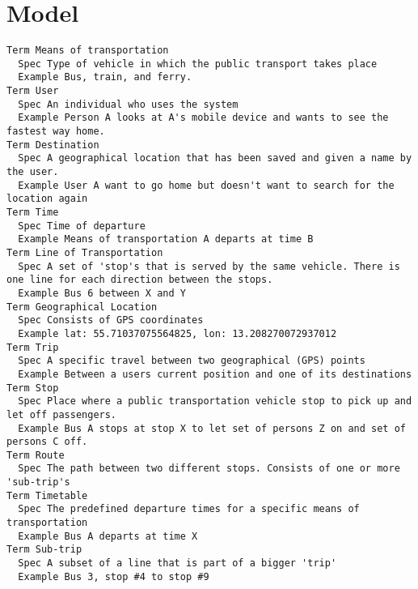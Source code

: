 \chapter{Model}


\begin{lstlisting}
Term Means of transportation
  Spec Type of vehicle in which the public transport takes place
  Example Bus, train, and ferry.
Term User
  Spec An individual who uses the system
  Example Person A looks at A's mobile device and wants to see the fastest way home.
Term Destination
  Spec A geographical location that has been saved and given a name by the user.
  Example User A want to go home but doesn't want to search for the location again
Term Time
  Spec Time of departure
  Example Means of transportation A departs at time B
Term Line of Transportation
  Spec A set of 'stop's that is served by the same vehicle. There is one line for each direction between the stops.
  Example Bus 6 between X and Y
Term Geographical Location
  Spec Consists of GPS coordinates
  Example lat: 55.71037075564825, lon: 13.208270072937012
Term Trip
  Spec A specific travel between two geographical (GPS) points
  Example Between a users current position and one of its destinations
Term Stop
  Spec Place where a public transportation vehicle stop to pick up and let off passengers.
  Example Bus A stops at stop X to let set of persons Z on and set of persons C off.
Term Route
  Spec The path between two different stops. Consists of one or more 'sub-trip's
Term Timetable
  Spec The predefined departure times for a specific means of transportation
  Example Bus A departs at time X
Term Sub-trip
  Spec A subset of a line that is part of a bigger 'trip'
  Example Bus 3, stop #4 to stop #9

\end{lstlisting}